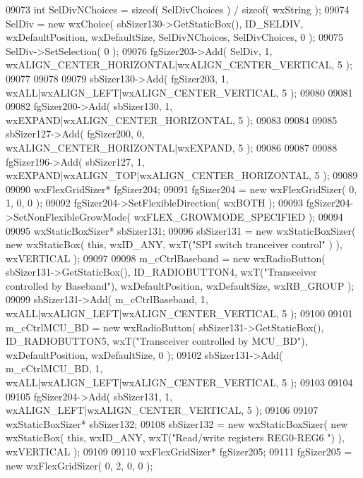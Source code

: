 \begin{DoxyCode}
09073     \textcolor{keywordtype}{int} SelDivNChoices = \textcolor{keyword}{sizeof}( SelDivChoices ) / \textcolor{keyword}{sizeof}( wxString );
09074     SelDiv = \textcolor{keyword}{new} wxChoice( sbSizer130->GetStaticBox(), ID_SELDIV, wxDefaultPosition, wxDefaultSize, 
      SelDivNChoices, SelDivChoices, 0 );
09075     SelDiv->SetSelection( 0 );
09076     fgSizer203->Add( SelDiv, 1, wxALIGN\_CENTER\_HORIZONTAL|wxALIGN\_CENTER\_VERTICAL, 5 );
09077     
09078     
09079     sbSizer130->Add( fgSizer203, 1, wxALL|wxALIGN\_LEFT|wxALIGN\_CENTER\_VERTICAL, 5 );
09080     
09081     
09082     fgSizer200->Add( sbSizer130, 1, wxEXPAND|wxALIGN\_CENTER\_HORIZONTAL, 5 );
09083     
09084     
09085     sbSizer127->Add( fgSizer200, 0, wxALIGN\_CENTER\_HORIZONTAL|wxEXPAND, 5 );
09086     
09087     
09088     fgSizer196->Add( sbSizer127, 1, wxEXPAND|wxALIGN\_TOP|wxALIGN\_CENTER\_HORIZONTAL, 5 );
09089     
09090     wxFlexGridSizer* fgSizer204;
09091     fgSizer204 = \textcolor{keyword}{new} wxFlexGridSizer( 0, 1, 0, 0 );
09092     fgSizer204->SetFlexibleDirection( wxBOTH );
09093     fgSizer204->SetNonFlexibleGrowMode( wxFLEX\_GROWMODE\_SPECIFIED );
09094     
09095     wxStaticBoxSizer* sbSizer131;
09096     sbSizer131 = \textcolor{keyword}{new} wxStaticBoxSizer( \textcolor{keyword}{new} wxStaticBox( \textcolor{keyword}{this}, wxID\_ANY, wxT(\textcolor{stringliteral}{"SPI switch tranceiver control"}
      ) ), wxVERTICAL );
09097     
09098     m_cCtrlBaseband = \textcolor{keyword}{new} wxRadioButton( sbSizer131->GetStaticBox(), 
      ID_RADIOBUTTON4, wxT(\textcolor{stringliteral}{"Transceiver controlled by Baseband"}), wxDefaultPosition, wxDefaultSize, wxRB\_GROUP );
09099     sbSizer131->Add( m_cCtrlBaseband, 1, wxALL|wxALIGN\_LEFT|wxALIGN\_CENTER\_VERTICAL, 5 );
09100     
09101     m_cCtrlMCU_BD = \textcolor{keyword}{new} wxRadioButton( sbSizer131->GetStaticBox(), 
      ID_RADIOBUTTON5, wxT(\textcolor{stringliteral}{"Transceiver controlled by MCU\_BD"}), wxDefaultPosition, wxDefaultSize, 0 );
09102     sbSizer131->Add( m_cCtrlMCU_BD, 1, wxALL|wxALIGN\_LEFT|wxALIGN\_CENTER\_VERTICAL, 5 );
09103     
09104     
09105     fgSizer204->Add( sbSizer131, 1, wxALIGN\_LEFT|wxALIGN\_CENTER\_VERTICAL, 5 );
09106     
09107     wxStaticBoxSizer* sbSizer132;
09108     sbSizer132 = \textcolor{keyword}{new} wxStaticBoxSizer( \textcolor{keyword}{new} wxStaticBox( \textcolor{keyword}{this}, wxID\_ANY, wxT(\textcolor{stringliteral}{"Read/write registers REG0-REG6
      "}) ), wxVERTICAL );
09109     
09110     wxFlexGridSizer* fgSizer205;
09111     fgSizer205 = \textcolor{keyword}{new} wxFlexGridSizer( 0, 2, 0, 0 );

\end{DoxyCode}
